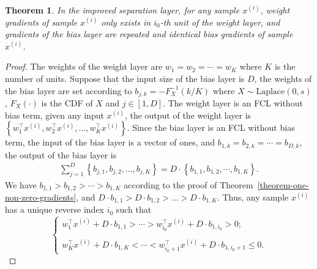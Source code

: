 \documentclass[lettersize,journal]{IEEEtran}
\newtheorem{theorem}{Theorem}
\begin{document}
\begin{theorem}
\label{theorem-improved-structre}
In the improved separation layer, for any sample $x^{\left(i\right)}$, weight gradients of sample $x^{\left(i\right)}$ only exists in $i_0$-th unit of the weight layer, and gradients of the bias layer are repeated and identical bias gradients of sample $x^{\left(i\right)}$.
\end{theorem}
\begin{proof}
The weights of the weight layer are $w_1 = w_2 = \cdots = w_K$ where $K$ is the number of units. Suppose that the input size of the bias layer is $D$, the weights of the bias layer are set according to $b_{j,k} = - F^{-1}_X( k / K)$ where $X \sim \textrm{Laplace}(0,s)$, $F_X(\cdot)$ is the CDF of $X$ and $j \in \left[1, D\right]$. The weight layer is an FCL without bias term, given any input $x^{\left( i\right)}$, the output of the weight layer is $\left\{ w_1^\intercal x^{\left( i\right)}, w_2^\intercal x^{\left( i\right)}, \dots, w_K^\intercal x^{\left( i\right)} \right\}.$
Since the bias layer is an FCL without bias term, the input of the bias layer is a vector of ones, and $b_{1,k} = b_{2,k} = \cdots = b_{D,k}$, the output of the bias layer is
\begin{align}
    \sum_{j=1}^{D} \left\{  b_{j,1}, b_{j,2}, \dots, b_{j,K} \right\} 
    =  D \cdot \left\{  b_{1,1}, b_{1,2}, \cdots, b_{1,K}\right\}.
\end{align}
We have $b_{1,1} > b_{1,2} > \cdots > b_{1,K}$ according to the proof of Theorem~\ref{theorem-one-non-zero-gradients}, and $D \cdot b_{1,1} > D \cdot b_{1,2} > \dots > D \cdot b_{1,K}$. Thus, any sample $x^{\left( i\right)}$ has a unique reverse index $i_0$ such that
\begin{equation}
    \left\{ \begin{matrix}
        w_1^\intercal x^{\left(i\right)} + D \cdot b_{1,1} > \cdots > w_{i_0}^\intercal x^{\left(i\right)} + D \cdot b_{1, i_0} > 0; \\ \\
        w_K^\intercal x^{\left(i\right)} + D \cdot b_{1,K} < \cdots < w_{i_0+1}^\intercal x^{\left(i\right)} + D \cdot b_{1, i_0+1} \leq 0.
        

\end{matrix}
\end{equation}
\end{proof}
\end{document}
